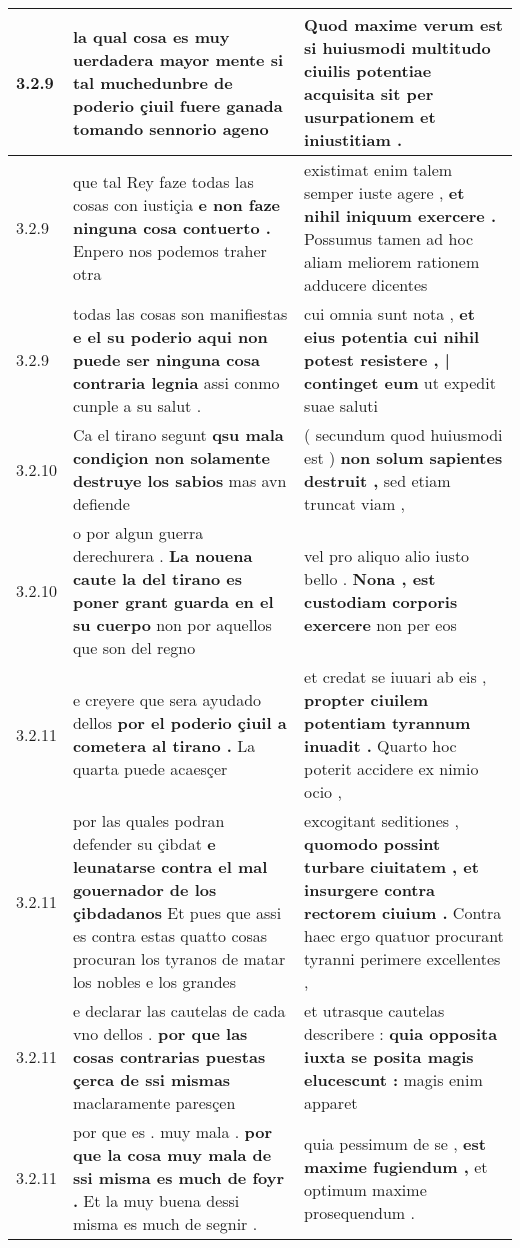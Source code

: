 \begin{tabular}{|p{1cm}|p{6.5cm}|p{6.5cm}|}
3.2.9 & la qual cosa es muy uerdadera mayor mente \textbf{ si tal muchedunbre de poderio çiuil fuere ganada } tomando sennorio ageno & Quod maxime verum est \textbf{ si huiusmodi multitudo ciuilis potentiae acquisita sit } per usurpationem et iniustitiam . \\\hline
3.2.9 & que tal Rey faze todas las cosas con iustiçia \textbf{ e non faze ninguna cosa contuerto . } Enpero nos podemos traher otra & existimat enim talem semper iuste agere , \textbf{ et nihil iniquum exercere . } Possumus tamen ad hoc aliam meliorem rationem adducere dicentes \\\hline
3.2.9 & todas las cosas son manifiestas \textbf{ e el su poderio aqui non puede ser ninguna cosa contraria legnia } assi conmo cunple a su salut . & cui omnia sunt nota , \textbf{ et eius potentia cui nihil potest resistere , | continget eum } ut expedit suae saluti \\\hline
3.2.10 & Ca el tirano segunt \textbf{ qsu mala condiçion non solamente destruye los sabios } mas avn defiende & ( secundum quod huiusmodi est ) \textbf{ non solum sapientes destruit , } sed etiam truncat viam , \\\hline
3.2.10 & o por algun guerra derechurera . \textbf{ La nouena caute la del tirano es poner grant guarda en el su cuerpo } non por aquellos que son del regno & vel pro aliquo alio iusto bello . \textbf{ Nona , est custodiam corporis exercere } non per eos \\\hline
3.2.11 & e creyere que sera ayudado dellos \textbf{ por el poderio çiuil a cometera al tirano . } La quarta puede acaesçer & et credat se iuuari ab eis , \textbf{ propter ciuilem potentiam tyrannum inuadit . } Quarto hoc poterit accidere ex nimio ocio , \\\hline
3.2.11 & por las quales podran defender su çibdat \textbf{ e leunatarse contra el mal gouernador de los çibdadanos } Et pues que assi es contra estas quatto cosas procuran los tyranos de matar los nobles e los grandes & excogitant seditiones , \textbf{ quomodo possint turbare ciuitatem , et insurgere contra rectorem ciuium . } Contra haec ergo quatuor procurant tyranni perimere excellentes , \\\hline
3.2.11 & e declarar las cautelas de cada vno dellos . \textbf{ por que las cosas contrarias puestas çerca de ssi mismas } maclaramente paresçen & et utrasque cautelas describere : \textbf{ quia opposita iuxta se posita magis elucescunt : } magis enim apparet \\\hline
3.2.11 & por que es . muy mala . \textbf{ por que la cosa muy mala de ssi misma es much de foyr . } Et la muy buena dessi misma es much de segnir . & quia pessimum de se , \textbf{ est maxime fugiendum , } et optimum maxime prosequendum . \\\hline

\end{tabular}
